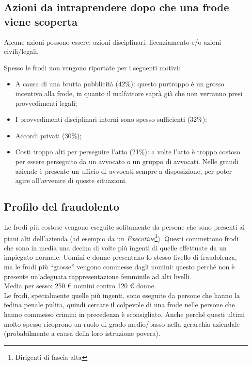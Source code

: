\subsection{Azioni da intraprendere dopo che una frode viene scoperta}

Alcune azioni possono essere: azioni disciplinari, licenziamento e/o azioni 
civili/legali.

Spesso le frodi non vengono riportate per i seguenti motivi:
\begin{itemize}
  \item A causa di una brutta pubblicità (42\%): questo purtroppo è un grosso 
  incentivo alla frode, in quanto il malfattore
  saprà già che non verranno presi provvedimenti legali;
  \item I provvedimenti disciplinari interni sono spesso sufficienti (32\%);
  \item Accordi privati (30\%);
  \item Costi troppo alti per perseguire l'atto (21\%): a volte l'atto è troppo 
  costoso per essere perseguito da un avvocato o un
  gruppo di avvocati. Nelle grandi aziende è presente un ufficio di avvocati
  sempre a disposizione, per poter agire all'avvenire di queste situazioni.
\end{itemize}

\subsection{Profilo del fraudolento}

Le frodi più costose vengono eseguite solitamente da persone che sono presenti
ai piani alti dell'azienda (ad esempio da un \textit{Executive}\footnote{Dirigenti 
di fascia alta}). Questi commettono frodi che sono in media una decina di volte
più ingenti di quelle effettuate da un impiegato normale. Uomini e donne presentano 
lo stesso livello di fraudolenza, ma le frodi più ``grosse'' vengono commesse dagli 
uomini: questo perché non è presente un'adeguata rappresentazione femminile ad 
alti livelli.\\
\newline
Media per sesso: 250 \euro{} uomini contro 120 \euro{} donne.\\
\newline
Le frodi, specialmente quelle più ingenti, sono eseguite da persone che hanno la fedina
penale pulita, quindi cercare il colpevole di una frode nelle persone che hanno commesso
 crimini in precedenza è sconsigliato. Anche perché questi ultimi molto spesso ricoprono 
un ruolo di grado medio/basso nella gerarchia aziendale (probabilmente a causa della 
loro istruzione povera).

